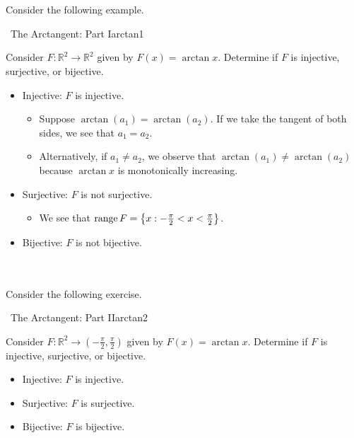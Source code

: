         \\
        \\
        Consider the following example.
        \begin{example}{\Difficulty\,\Difficulty\,\,The Arctangent: Part I}{arctan1}
        
            Consider \(F:\mathbb{R}^2\to\mathbb{R}^2\) given by \(F(x)=\arctan x\). Determine if \(F\) is injective, surjective, or bijective.
            \begin{itemize}
                \item Injective: \(F\) is injective.
                \begin{itemize}
                    \item Suppose \(\arctan(a_1)=\arctan(a_2)\). If we take the tangent of both sides, we see that \(a_1=a_2\).
                    \item Alternatively, if \(a_1\neq a_2\), we observe that \(\arctan(a_1)\neq\arctan(a_2)\) because \(\arctan x\) is monotonically increasing.
                \end{itemize}
                \item Surjective: \(F\) is not surjective.
                \begin{itemize}
                    \item We see that \(\text{range\,} F=\left\{x:-\frac{\pi}{2}<x<\frac{\pi}{2}\right\}\).
                \end{itemize}
                \item Bijective: \(F\) is not bijective.
            \end{itemize}
        
        \end{example}
        \pagebreak
        \vphantom
        \\
        \\
        Consider the following exercise.
        \begin{example}{\Difficulty\,\Difficulty\,\,The Arctangent: Part II}{arctan2}
        
            Consider \(F:\mathbb{R}^2\to\left(-\frac{\pi}{2},\frac{\pi}{2}\right)\) given by \(F(x)=\arctan x\). Determine if \(F\) is injective, surjective, or bijective.
            \begin{itemize}
                \item Injective: \(F\) is injective.
                \item Surjective: \(F\) is surjective.
                \item Bijective: \(F\) is bijective.
            \end{itemize}
        
        \end{example}
